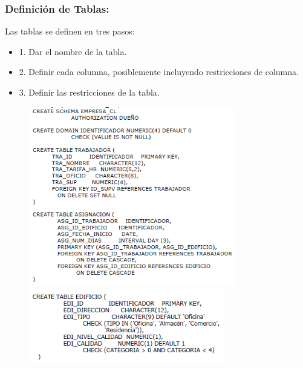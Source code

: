 \documentclass[preprint,12pt]{elsarticle}
\begin{document}
\subsubsection{\textbf{Definición de Tablas:}}	
Las tablas se definen en tres pasos:
\begin{itemize}
\item 1. Dar el nombre de la tabla.
\item 2. Definir cada columna, posiblemente incluyendo restricciones de columna.
\item 3. Definir las restricciones de la tabla.
\end{itemize}
	\begin{figure}[htb]
		\begin{center}
			\includegraphics[width=9cm]{./IMAGENES/ejtablas}
			\includegraphics[width=8.5cm]{./IMAGENES/ejtablas2}
		\end{center}
	\end{figure}
\end{document}
